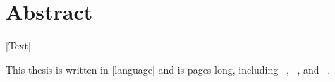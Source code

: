 \section*{\centering Abstract}

[Text]

This thesis is written in [language] and is \pageref*{EndOfMainPart}
pages long, including \totalchapters\ , \totalfigures\ ,\linebreak
and \totaltables\ .

\pagebreak
